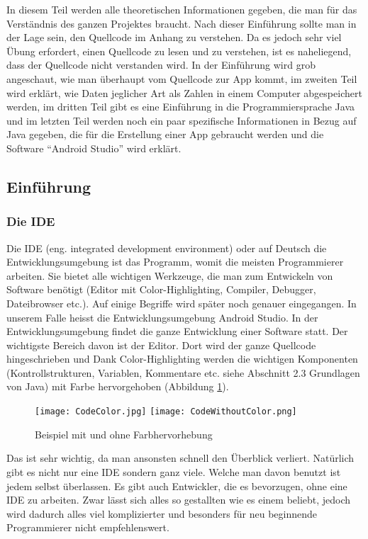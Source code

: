 In diesem Teil werden alle theoretischen Informationen gegeben, die man für das Verständnis des ganzen Projektes braucht. Nach dieser Einführung sollte man in der Lage sein, den Quellcode im Anhang zu verstehen. Da es jedoch sehr viel Übung erfordert, einen Quellcode zu lesen und zu verstehen, ist es naheliegend, dass der Quellcode nicht verstanden wird. In der Einführung wird grob angeschaut, wie man überhaupt vom Quellcode zur App kommt, im zweiten Teil wird erklärt, wie Daten jeglicher Art als Zahlen in einem Computer abgespeichert werden, im dritten Teil gibt es eine Einführung in die Programmiersprache Java und im letzten Teil werden noch ein paar spezifische Informationen in Bezug auf Java gegeben, die für die Erstellung einer App gebraucht werden und die Software "`Android Studio"' wird erklärt.

\subsection{Einführung}
\subsubsection{Die IDE}
Die IDE (eng. integrated development environment) oder auf Deutsch die Entwicklungsumgebung ist das Programm, womit die meisten Programmierer arbeiten. Sie bietet alle wichtigen Werkzeuge, die man zum Entwickeln von Software benötigt (Editor mit Color-Highlighting, Compiler, Debugger, Dateibrowser etc.). Auf einige Begriffe wird später noch genauer eingegangen. In unserem Falle heisst die Entwicklungsumgebung Android Studio. In der Entwicklungsumgebung findet die ganze Entwicklung einer Software statt. Der wichtigste Bereich davon ist der Editor. Dort wird der ganze Quellcode hingeschrieben und Dank Color-Highlighting werden die wichtigen Komponenten (Kontrollstrukturen, Variablen, Kommentare etc. siehe Abschnitt 2.3 Grundlagen von Java) mit Farbe hervorgehoben (Abbildung \ref{fig:Colorhighlighting}).
\begin{figure}[htbp] 
  \centering
     \texttt{[image: CodeColor.jpg]}
     \texttt{[image: CodeWithoutColor.png]}
  \caption{Beispiel mit und ohne Farbhervorhebung \cite{Colorhighlighting}}
  \label{fig:Colorhighlighting}
\end{figure}
Das ist sehr wichtig, da man ansonsten schnell den Überblick verliert. Natürlich gibt es nicht nur eine IDE sondern ganz viele. Welche man davon benutzt ist jedem selbst überlassen. Es gibt auch Entwickler, die es bevorzugen, ohne eine IDE zu arbeiten. Zwar lässt sich alles so gestallten wie es einem beliebt, jedoch wird dadurch alles viel komplizierter und besonders für neu beginnende Programmierer nicht empfehlenswert.

